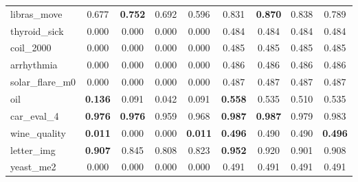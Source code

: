\begin{figure}[ht]
\begin{tabular}{p{22mm}|*4{p{14mm}}|*4{p{14mm}}}
        libras\_move&\multicolumn{1}{c}{0.677}&\multicolumn{1}{c}{\textbf{0.752}}&\multicolumn{1}{c}{0.692}&\multicolumn{1}{c|}{0.596}&\multicolumn{1}{c}{0.831}&\multicolumn{1}{c}{\textbf{0.870}}&\multicolumn{1}{c}{0.838}&\multicolumn{1}{c}{0.789}\\
        thyroid\_sick&\multicolumn{1}{c}{0.000}&\multicolumn{1}{c}{0.000}&\multicolumn{1}{c}{0.000}&\multicolumn{1}{c|}{0.000}&\multicolumn{1}{c}{0.484}&\multicolumn{1}{c}{0.484}&\multicolumn{1}{c}{0.484}&\multicolumn{1}{c}{0.484}\\
        coil\_2000&\multicolumn{1}{c}{0.000}&\multicolumn{1}{c}{0.000}&\multicolumn{1}{c}{0.000}&\multicolumn{1}{c|}{0.000}&\multicolumn{1}{c}{0.485}&\multicolumn{1}{c}{0.485}&\multicolumn{1}{c}{0.485}&\multicolumn{1}{c}{0.485}\\
        arrhythmia&\multicolumn{1}{c}{0.000}&\multicolumn{1}{c}{0.000}&\multicolumn{1}{c}{0.000}&\multicolumn{1}{c|}{0.000}&\multicolumn{1}{c}{0.486}&\multicolumn{1}{c}{0.486}&\multicolumn{1}{c}{0.486}&\multicolumn{1}{c}{0.486}\\
        solar\_flare\_m0&\multicolumn{1}{c}{0.000}&\multicolumn{1}{c}{0.000}&\multicolumn{1}{c}{0.000}&\multicolumn{1}{c|}{0.000}&\multicolumn{1}{c}{0.487}&\multicolumn{1}{c}{0.487}&\multicolumn{1}{c}{0.487}&\multicolumn{1}{c}{0.487}\\
        oil&\multicolumn{1}{c}{\textbf{0.136}}&\multicolumn{1}{c}{0.091}&\multicolumn{1}{c}{0.042}&\multicolumn{1}{c|}{0.091}&\multicolumn{1}{c}{\textbf{0.558}}&\multicolumn{1}{c}{0.535}&\multicolumn{1}{c}{0.510}&\multicolumn{1}{c}{0.535}\\
        car\_eval\_4&\multicolumn{1}{c}{\textbf{0.976}}&\multicolumn{1}{c}{\textbf{0.976}}&\multicolumn{1}{c}{0.959}&\multicolumn{1}{c|}{0.968}&\multicolumn{1}{c}{\textbf{0.987}}&\multicolumn{1}{c}{\textbf{0.987}}&\multicolumn{1}{c}{0.979}&\multicolumn{1}{c}{0.983}\\
        wine\_quality&\multicolumn{1}{c}{\textbf{0.011}}&\multicolumn{1}{c}{0.000}&\multicolumn{1}{c}{0.000}&\multicolumn{1}{c|}{\textbf{0.011}}&\multicolumn{1}{c}{\textbf{0.496}}&\multicolumn{1}{c}{0.490}&\multicolumn{1}{c}{0.490}&\multicolumn{1}{c}{\textbf{0.496}}\\
        letter\_img&\multicolumn{1}{c}{\textbf{0.907}}&\multicolumn{1}{c}{0.845}&\multicolumn{1}{c}{0.808}&\multicolumn{1}{c|}{0.823}&\multicolumn{1}{c}{\textbf{0.952}}&\multicolumn{1}{c}{0.920}&\multicolumn{1}{c}{0.901}&\multicolumn{1}{c}{0.908}\\
        yeast\_me2&\multicolumn{1}{c}{0.000}&\multicolumn{1}{c}{0.000}&\multicolumn{1}{c}{0.000}&\multicolumn{1}{c|}{0.000}&\multicolumn{1}{c}{0.491}&\multicolumn{1}{c}{0.491}&\multicolumn{1}{c}{0.491}&\multicolumn{1}{c}{0.491}\\

\end{tabular}
\end{figure}
